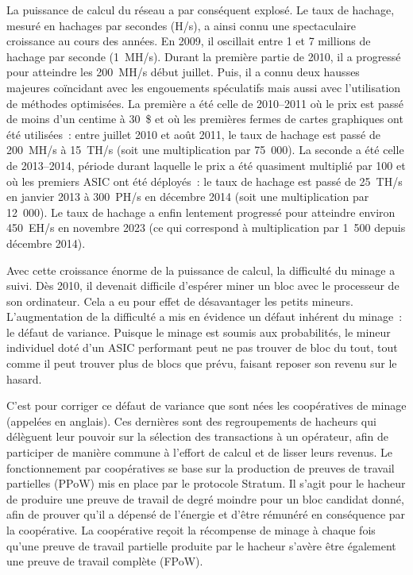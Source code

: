 La puissance de calcul du réseau a par conséquent explosé. Le taux de hachage, mesuré en hachages par secondes (H/s), a ainsi connu une spectaculaire croissance au cours des années. En 2009, il oscillait entre 1 et 7 millions de hachage par seconde (1~MH/s). Durant la première partie de 2010, il a progressé pour atteindre les 200~MH/s début juillet. Puis, il a connu deux hausses majeures coïncidant avec les engouements spéculatifs mais aussi avec l'utilisation de méthodes optimisées. La première a été celle de 2010--2011 où le prix est passé de moins d'un centime à 30~\$ et où les premières fermes de cartes graphiques ont été utilisées~: entre juillet 2010 et août 2011, le taux de hachage est passé de 200~MH/s à 15~TH/s (soit une multiplication par 75~000). La seconde a été celle de 2013--2014, période durant laquelle le prix a été quasiment multiplié par 100 et où les premiers ASIC ont été déployés~: le taux de hachage est passé de 25~TH/s en janvier 2013 à 300~PH/s en décembre 2014 (soit une multiplication par 12~000). Le taux de hachage a enfin lentement progressé pour atteindre environ 450~EH/s en novembre 2023 (ce qui correspond à multiplication par 1~500 depuis décembre 2014).


Avec cette croissance énorme de la puissance de calcul, la difficulté du minage a suivi. Dès 2010, il devenait difficile d'espérer miner un bloc avec le processeur de son ordinateur. Cela a eu pour effet de désavantager les petits mineurs. L'augmentation de la difficulté a mis en évidence un défaut inhérent du minage~: le défaut de variance. Puisque le minage est soumis aux probabilités, le mineur individuel doté d'un ASIC performant peut ne pas trouver de bloc du tout, tout comme il peut trouver plus de blocs que prévu, faisant reposer son revenu sur le hasard.

C'est pour corriger ce défaut de variance que sont nées les coopératives de minage (appelées  en anglais). Ces dernières sont des regroupements de hacheurs qui délèguent leur pouvoir sur la sélection des transactions à un opérateur, afin de participer de manière commune à l'effort de calcul et de lisser leurs revenus. Le fonctionnement par coopératives se base sur la production de preuves de travail partielles (PPoW) mis en place par le protocole Stratum. Il s'agit pour le hacheur de produire une preuve de travail de degré moindre pour un bloc candidat donné, afin de prouver qu'il a dépensé de l'énergie et d'être rémunéré en conséquence par la coopérative. La coopérative reçoit la récompense de minage à chaque fois qu'une preuve de travail partielle produite par le hacheur s'avère être également une preuve de travail complète (FPoW).


